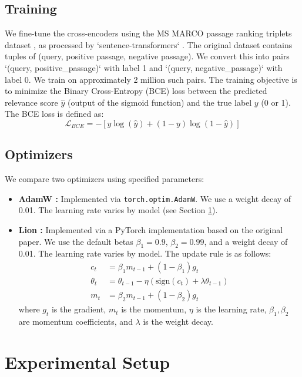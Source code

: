 \documentclass[conference]{IEEEtran}
\begin{document}
\subsection{Training}
We fine-tune the cross-encoders using the MS MARCO passage ranking triplets dataset \cite{DBLP:journals/corr/NguyenRSGTMD16}, as processed by `sentence-transformers` \cite{reimers2019sentence}. The original dataset contains tuples of (query, positive passage, negative passage). We convert this into pairs `(query, positive\_passage)` with label 1 and `(query, negative\_passage)` with label 0. We train on approximately 2 million such pairs.
The training objective is to minimize the Binary Cross-Entropy (BCE) loss between the predicted relevance score $\hat{y}$ (output of the sigmoid function) and the true label $y$ (0 or 1). The BCE loss is defined as:
\[ \mathcal{L}_{BCE} = - [y \log(\hat{y}) + (1 - y) \log(1 - \hat{y})] \]


\subsection{Optimizers}
We compare two optimizers using specified parameters:
\begin{itemize}
    \item \textbf{AdamW \cite{loshchilov2019decoupled}:} Implemented via \texttt{torch.optim.AdamW}. We use a weight decay of 0.01. The learning rate varies by model (see Section \ref{sec:experimental_setup}).
    \item \textbf{Lion \cite{chen2023symbolic}:} Implemented via a PyTorch implementation based on the original paper. We use the default betas $\beta_1 = 0.9$, $\beta_2 = 0.99$, and a weight decay of 0.01. The learning rate varies by model. The update rule is as follows:
    \begin{align*}
    c_t &= \beta_1 m_{t-1} + (1 - \beta_1) g_t \\
    \theta_t &= \theta_{t-1} - \eta \left( \text{sign}(c_t) + \lambda \theta_{t-1} \right) \\
    m_t &= \beta_2 m_{t-1} + (1 - \beta_2) g_t
    \end{align*}
    where $g_t$ is the gradient, $m_t$ is the momentum, $\eta$ is the learning rate, $\beta_1, \beta_2$ are momentum coefficients, and $\lambda$ is the weight decay.
\end{itemize}

\section{Experimental Setup}
\label{sec:experimental_setup}
\end{document}
